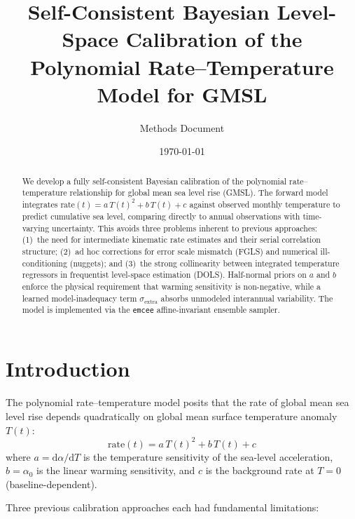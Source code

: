 \documentclass[11pt]{article}
\title{Self-Consistent Bayesian Level-Space Calibration of the\\
  Polynomial Rate--Temperature Model for GMSL}
\author{Methods Document}
\date{\today}
\newcommand{\sigextra}{\sigma_{\text{extra}}}
\newcommand{\daT}{\mathrm{d}\alpha/\mathrm{d}T}
\begin{document}
\maketitle

\begin{abstract}
We develop a fully self-consistent Bayesian calibration of the polynomial rate--temperature relationship for global mean sea level rise (GMSL).  The forward model integrates $\text{rate}(t) = a\,T(t)^2 + b\,T(t) + c$ against observed monthly temperature to predict cumulative sea level, comparing directly to annual observations with time-varying uncertainty.  This avoids three problems inherent to previous approaches: (1)~the need for intermediate kinematic rate estimates and their serial correlation structure; (2)~ad hoc corrections for error scale mismatch (FGLS) and numerical ill-conditioning (nuggets); and (3)~the strong collinearity between integrated temperature regressors in frequentist level-space estimation (DOLS).  Half-normal priors on $a$ and $b$ enforce the physical requirement that warming sensitivity is non-negative, while a learned model-inadequacy term $\sigextra$ absorbs unmodeled interannual variability.  The model is implemented via the \texttt{emcee} affine-invariant ensemble sampler.
\end{abstract}


\section{Introduction}

The polynomial rate--temperature model posits that the rate of global mean sea level rise depends quadratically on global mean surface temperature anomaly~$T(t)$:
\begin{equation}
  \text{rate}(t) = a\,T(t)^2 + b\,T(t) + c
  \label{eq:rate}
\end{equation}
where $a = \daT$ is the temperature sensitivity of the sea-level acceleration, $b = \alpha_0$ is the linear warming sensitivity, and $c$ is the background rate at $T = 0$ (baseline-dependent).

Three previous calibration approaches each had fundamental limitations:
\end{document}
